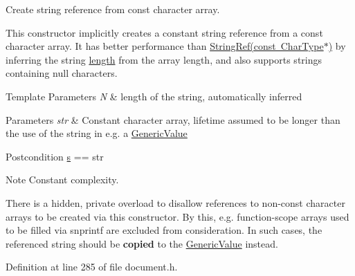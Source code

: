 Create string reference from {\ttfamily const} character array. 

This constructor implicitly creates a constant string reference from a {\ttfamily const} character array. It has better performance than \mbox{\hyperlink{structrapidjson_1_1_generic_string_ref_aa6b9fd9f6aa49405a574c362ba9af6b5}{String\+Ref(const Char\+Type$\ast$)}} by inferring the string \mbox{\hyperlink{structrapidjson_1_1_generic_string_ref_ae223535ec20edf0c1db44a40b7735111}{length}} from the array length, and also supports strings containing null characters.


\begin{DoxyTemplParams}{Template Parameters}
{\em N} & length of the string, automatically inferred\\
\hline
\end{DoxyTemplParams}

\begin{DoxyParams}{Parameters}
{\em str} & Constant character array, lifetime assumed to be longer than the use of the string in e.\+g. a \mbox{\hyperlink{classrapidjson_1_1_generic_value}{Generic\+Value}}\\
\hline
\end{DoxyParams}
\begin{DoxyPostcond}{Postcondition}
\mbox{\hyperlink{structrapidjson_1_1_generic_string_ref_a001276ee57cbcbd3c14449045c71e994}{s}} == str
\end{DoxyPostcond}
\begin{DoxyNote}{Note}
Constant complexity. 

There is a hidden, private overload to disallow references to non-\/const character arrays to be created via this constructor. By this, e.\+g. function-\/scope arrays used to be filled via {\ttfamily snprintf} are excluded from consideration. In such cases, the referenced string should be {\bfseries{copied}} to the \mbox{\hyperlink{classrapidjson_1_1_generic_value}{Generic\+Value}} instead. 
\end{DoxyNote}


Definition at line 285 of file document.\+h.


\begin{DoxyCode}{0}

\end{DoxyCode}
\mbox{\label{structrapidjson_1_1_generic_string_ref_a29cf407c6aa2313f13dff78d6ce02687}} 
